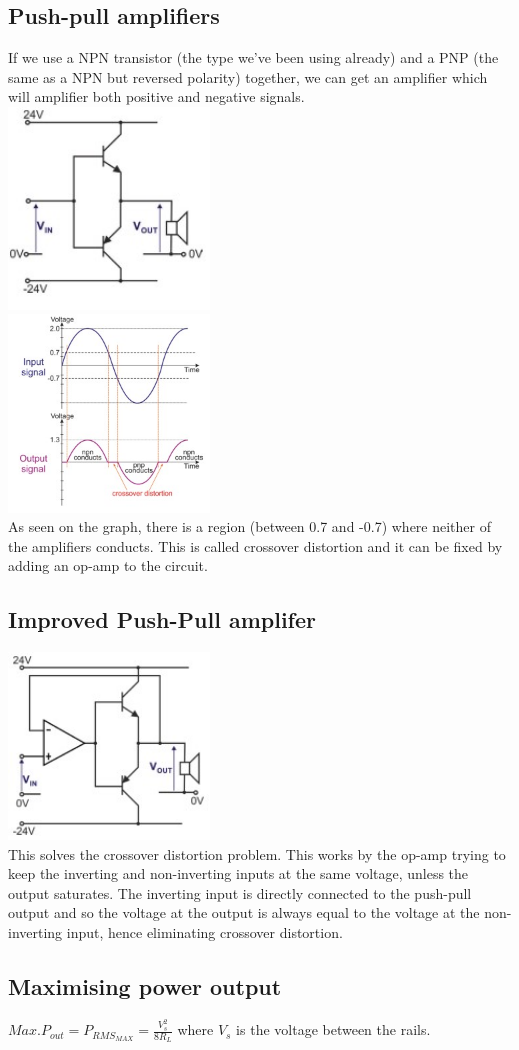 \documentclass[a4paper, 11pt, twocolumn]{article}
\begin{document}
    \subsection{Push-pull amplifiers}
    If we use a NPN transistor (the type we've been using already) and a PNP (the same as a NPN but reversed polarity) together, we can get an amplifier which will amplifier both positive and negative signals.\\
    \includegraphics[width=0.4\textwidth]{pushPull.jpg}\\
    \includegraphics[width=0.4\textwidth]{pushPullOut.jpg} \\
    As seen on the graph, there is a region (between 0.7 and -0.7) where neither of the amplifiers conducts. This is called crossover distortion and it can be fixed by adding an op-amp to the circuit.

    \subsection{Improved Push-Pull amplifer}
    \includegraphics[width=0.4\textwidth]{opAmpPP.jpg}\\
    This solves the crossover distortion problem. This works by the op-amp trying to keep the inverting and non-inverting inputs at the same voltage, unless the output saturates. The inverting input is directly connected to the push-pull output and so the voltage at the output is always equal to the voltage at the non-inverting input, hence eliminating crossover distortion.

    \subsection{Maximising power output}
    $\displaystyle Max.P_{out} = P_{RMS_{MAX}} = \frac{V_s^2}{8R_L}$ where $V_s$ is the voltage between the rails.
\end{document}
